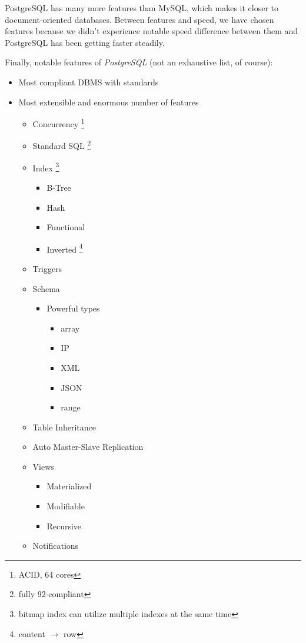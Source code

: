 PostgreSQL has many more features than MySQL, which makes it closer to document-oriented databases. Between features and speed, we have chosen features because we didn't experience notable speed difference between them and PostgreSQL has been getting faster steadily.

Finally, notable features of \textit{PostgreSQL} (not an exhaustive list, of course):

\begin{itemize}
  \item Most compliant DBMS with standards
  \item Most extensible and enormous number of features
  \begin{itemize}
    \item Concurrency \footnote{ACID, 64 cores}
	\item Standard SQL \footnote{fully 92-compliant}
	\item Index \footnote{bitmap index can utilize multiple indexes at the same time}
	\begin{itemize}
	  \item B-Tree
	  \item Hash
	  \item Functional
	  \item Inverted \footnote{content $\rightarrow$ row}
	\end{itemize}
	\item Triggers
	\item Schema
	\begin{itemize}
	  \item Powerful types
	  \begin{itemize}
	    \item array
	    \item IP
	    \item XML
	    \item JSON
	    \item range
	  \end{itemize}
	\end{itemize}
	\item Table Inheritance
	\item Auto Master-Slave Replication
	\item Views
	\begin{itemize}
	  \item Materialized
	  \item Modifiable
	  \item Recursive
	\end{itemize}
	\item Notifications

\end{itemize}
\end{itemize}

